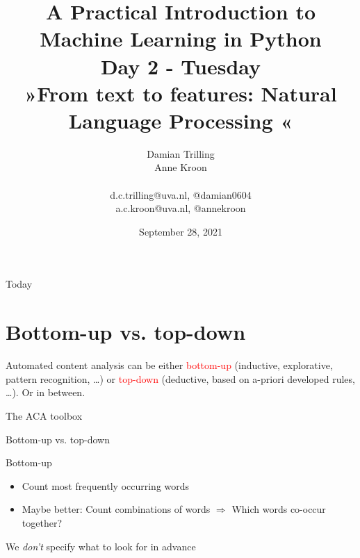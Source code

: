\documentclass[compress]{beamer}
\title[Big Data and Automated Content Analysis]{\textbf{A Practical Introduction to Machine Learning in Python} \\Day 2 - Tuesday \\ »From text to features: Natural Language Processing «}
\author[Damian Trilling, Anne Kroon]{Damian Trilling \\ Anne Kroon \\ ~ \\ \footnotesize{d.c.trilling@uva.nl, @damian0604 \\a.c.kroon@uva.nl, @annekroon} \\}
\date{September 28, 2021}
\institute[Gesis]{Gesis}
\begin{document}
	
	\begin{frame}{}
		\titlepage
	\end{frame}
	
	\begin{frame}{Today}
		\tableofcontents
	\end{frame}

\section{Bottom-up vs. top-down}

\begin{frame}[standout]
Automated content analysis can be either \textcolor{red}{bottom-up} (inductive, explorative, pattern recognition, \ldots) or \textcolor{red}{top-down} (deductive, based on a-priori developed rules, \ldots). Or in between.
\end{frame}


\begin{frame}{The ACA toolbox}
\\
\cite{Boumans2016}
\end{frame}


\begin{frame}{Bottom-up vs. top-down}
\begin{block}{Bottom-up}
\begin{itemize}
\item Count most frequently occurring words 
\item Maybe better: Count combinations of words $\Rightarrow$ Which words co-occur together?
\end{itemize}
We \emph{don't} specify what to look for in advance	
\end{block}

\end{frame}
\end{document}
